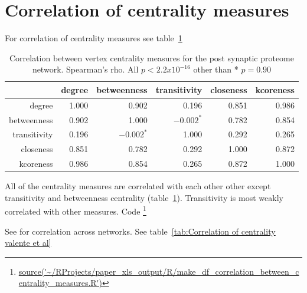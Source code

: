\section{Correlation of centrality measures}

For correlation of centrality measures see table~\ref{tab:Correlation between vertex centrality measures for PSP. Spearman's rho}


\begin{table}[ht]
\centering
\begin{tabular}{rrrrrr}
  \hline
 & degree & betweenness & transitivity & closeness & kcoreness \\ 
  \hline
degree & 1.000 & 0.902 & 0.196 & 0.851 & 0.986 \\ 
  betweenness & 0.902 & 1.000 & $-0.002^*$ & 0.782 & 0.854 \\ 
  transitivity & 0.196 & $-0.002^*$ & 1.000 & 0.292 & 0.265 \\ 
  closeness & 0.851 & 0.782 & 0.292 & 1.000 & 0.872 \\  
 

  kcoreness & 0.986 & 0.854 & 0.265 & 0.872 & 1.000 \\ 
   \hline
\end{tabular}
\caption{Correlation between vertex centrality measures for the post synaptic proteome network. Spearman's rho. All $p < 2.2 x 10^{-16}$ other than * $p=0.90$} 
\label{tab:Correlation between vertex centrality measures for PSP. Spearman's rho}
\end{table}




All of the centrality measures are correlated with each other other except transitivity and betweenness centrality  (table~\ref{tab:Correlation between vertex centrality measures for PSP. Spearman's rho}). Transitivity is most weakly correlated with other measures. Code \footnote{\url{source('~/RProjects/paper_xls_output/R/make_df_correlation_between_centrality_measures.R')}}



See \cite{oldham2019consistency} for correlation across networks. See table~\ref{tab:Correlation of centrality valente et al}


